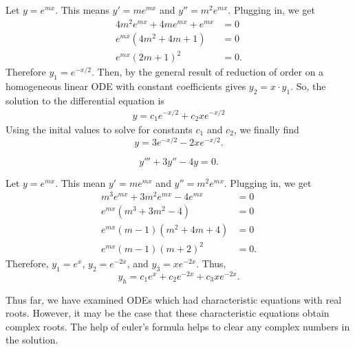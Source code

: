 \begin{soln}
    Let $y=e^{mx}$. This means $y' = me^{mx}$ and $y''=m^2e^{mx}$. Plugging in,
    we get
    \begin{align*}
        4m^2e^{mx} + 4me^{mx} + e^{mx} &= 0 \\
        e^{mx}(4m^2+4m+1) &=0 \\
        e^{mx}(2m+1)^2 &=0.
    \end{align*}
    Therefore $y_1 = e^{-x/2}$. Then, by the general result of reduction of order
    on a homogeneous linear ODE with constant coefficients gives $y_2 = x\cdot y_1$.
    So, the solution to the differential equation is 
    \begin{align*}
        y = c_1e^{-x/2} + c_2 x e^{-x/2}
    \end{align*}
    Using the inital values to solve for constants $c_1$ and $c_2$, we finally
    find
    $$y = 3e^{-x/2}-2xe^{-x/2}.$$
\end{soln}
\begin{example}
    $$y'''+3y''-4y = 0.$$
\end{example}
\begin{soln}
    Let $y=e^{mx}$. This mean $y' = me^{mx}$ and $y'' = m^2e^{mx}$. Plugging
    in, we get 
    \begin{align*}
        m^3e^{mx} + 3m^2e^{mx} -4e^{mx} &= 0 \\
        e^{mx}\left(m^3+3m^2-4\right) &= 0\\
        e^{mx}(m-1)(m^2+4m+4) &= 0\\
        e^{mx}(m-1)(m+2)^2 &= 0.
    \end{align*}
    Therefore, $y_1 = e^x$, $y_2 = e^{-2x}$, and $y_3 = xe^{-2x}$.
    Thus, $$y_h = c_1e^{x} + c_2e^{-2x} + c_3xe^{-2x}.$$
\end{soln}
Thus far, we have examined ODEs which had characteristic equations with real
roots. However, it may be the case that these characteristic equations obtain
complex roots. The help of \alert{euler's formula} helps to clear any complex
numbers in the solution.

